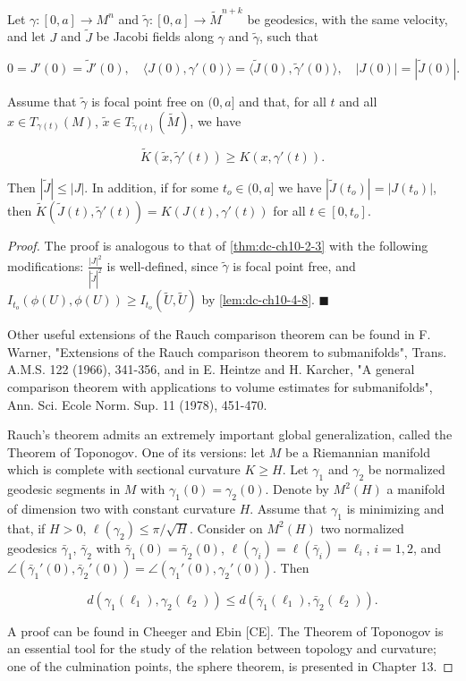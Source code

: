 \begin{theorem}
  \label{thm:dc-ch10-4-9}
  Let $\gamma:[0,a]\to M^n$ and $\tilde\gamma:[0,a]\to\widetilde{M}^{n+k}$ be
  geodesics, with the same velocity, and let $J$ and $\tilde J$ be Jacobi fields
  along $\gamma$ and $\tilde\gamma$, such that
  
  $$
  0=J'(0)=\tilde J'(0),\quad\langle J(0),\gamma'(0)\rangle=\langle \tilde J(0),\tilde\gamma'(0)\rangle,\quad|J(0)|=|\tilde J(0)|.
  $$
  
  Assume that $\tilde\gamma$ is focal point free on $(0,a]$ and that, for all $t$
  and all $x\in T_{\gamma(t)}(M)$, $\tilde x\in T_{\tilde\gamma(t)}(\widetilde{M})$,
  we have
  
  $$
  \widetilde{K}(\tilde x,\tilde\gamma'(t))\geq K(x,\gamma'(t)).
  $$
  
  Then $|\tilde J|\leq|J|$. In addition, if for some $t_o\in(0,a]$ we have
  $|\tilde J(t_o)|=|J(t_o)|$, then $\widetilde{K}(\tilde J(t),\tilde\gamma'(t))=K(J(t),\gamma'(t))$
  for all $t\in[0,t_o]$.
\end{theorem}
\begin{proof}
  The proof is analogous to that of \cref{thm:dc-ch10-2-3} with the following
  modifications: $\frac{|J|^2}{|\tilde J|^2}$ is well-defined, since $\tilde\gamma$
  is focal point free, and $I_{t_o}(\phi(U),\phi(U))\geq I_{t_o}(\tilde U,\tilde U)$
  by \cref{lem:dc-ch10-4-8}. $\blacksquare$
  
  Other useful extensions of the Rauch comparison theorem can be found in F. Warner,
  "Extensions of the Rauch comparison theorem to submanifolds", Trans. A.M.S. 122
  (1966), 341-356, and in E. Heintze and H. Karcher, "A general comparison theorem
  with applications to volume estimates for submanifolds", Ann. Sci. Ecole Norm.
  Sup. 11 (1978), 451-470.
  
  Rauch's theorem admits an extremely important global generalization, called the
  Theorem of Toponogov. One of its versions: let $M$ be a Riemannian manifold which
  is complete with sectional curvature $K\geq H$. Let $\gamma_1$ and $\gamma_2$ be
  normalized geodesic segments in $M$ with $\gamma_1(0)=\gamma_2(0)$. Denote by
  $M^2(H)$ a manifold of dimension two with constant curvature $H$. Assume that
  $\gamma_1$ is minimizing and that, if $H>0$, $\ell(\gamma_2)\leq\pi/\sqrt{H}$.
  Consider on $M^2(H)$ two normalized geodesics $\bar\gamma_1$, $\bar\gamma_2$ with
  $\bar\gamma_1(0)=\bar\gamma_2(0)$, $\ell(\gamma_i)=\ell(\bar\gamma_i)=\ell_i$,
  $i=1,2$, and $\angle(\bar\gamma_1'(0),\bar\gamma_2'(0))=\angle(\gamma_1'(0),\gamma_2'(0))$.
  Then
  
  $$
  d(\gamma_1(\ell_1),\gamma_2(\ell_2))\leq d(\bar\gamma_1(\ell_1),\bar\gamma_2(\ell_2)).
  $$
  
  A proof can be found in Cheeger and Ebin [CE]. The Theorem of Toponogov is an
  essential tool for the study of the relation between topology and curvature; one
  of the culmination points, the sphere theorem, is presented in Chapter 13.
\end{proof}
